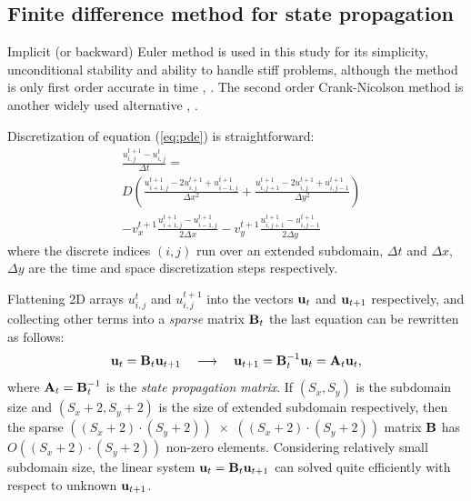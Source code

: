 \documentclass[conference,compsoc]{IEEEtran}
\begin{document}
\subsection{Finite difference method for state propagation\label{sec:finit-diff}}

Implicit (or backward) Euler method is used in this study for its simplicity, unconditional stability and ability to handle stiff problems, although the method is only first order accurate in time \cite{Sauer11}, \cite{Butcher03}. The second order Crank-Nicolson method is another widely used alternative \cite{Crank47}, \cite{Thomas95}.

\newcommand{\myu}[3]{u_{{#1},{#2}}^{#3}}
Discretization of equation (\ref{eq:pde}) is straightforward: 
\begin{equation}
\begin{aligned}
& \frac{\myu{i}{j}{t+1} - \myu{i}{j}{t}}{\Delta t} = {}\\
& D \left (
\frac{\myu{i+1}{j}{t+1} - 2\myu{i}{j}{t+1} + \myu{i-1}{j}{t+1}}{\Delta{x}^2} +  
\frac{\myu{i}{j+1}{t+1} - 2\myu{i}{j}{t+1} + \myu{i}{j-1}{t+1}}{\Delta{y}^2} \right) \\
& -v_x^{t+1} \frac{\myu{i+1}{j}{t+1} - \myu{i-1}{j}{t+1}}{2\Delta{x}}  
-v_y^{t+1} \frac{\myu{i}{j+1}{t+1} - \myu{i}{j-1}{t+1}}{2\Delta{y}} 
\end{aligned}
\label{eq:discrete-pde}
\end{equation}
where the discrete indices $(i,j)$ run over an extended subdomain, $\Delta{t}$ and $\Delta{x}$, $\Delta{y}$ are the time and space discretization steps respectively.

Flattening 2D arrays $\myu{i}{j}{t}$ and $\myu{i}{j}{t+1}$ into the vectors ${\bf u}_{t}$ and ${\bf u}_{t+1}$ respectively, and collecting other terms into a \textit{sparse} matrix ${\bf B}_t$ the last equation can be rewritten as follows:
\begin{equation}
{\bf u}_{t} = {\bf B}_t {\bf u}_{t+1} \quad \longrightarrow \quad
{\bf u}_{t+1} = {\bf B}^{-1}_t {\bf u}_{t} = {\bf A}_t {\bf u}_{t},
\label{eq:state-propag}
\end{equation}
where ${\bf A}_t = {\bf B}^{-1}_t$ is the \textit{state propagation matrix}. If $(S_x,S_y)$ is the subdomain size and $(S_x\!+\!2,S_y\!+\!2)$ is the size of extended subdomain respectively, then the sparse $((S_x\!+\!2)\!\cdot\!(S_y\!+\!2))\,\,{\times}\,\,((S_x\!+\!2)\!\cdot\!(S_y\!+\!2))$ matrix ${\bf B}$ has $O((S_x\!+\!2)\!\cdot\!(S_y\!+\!2))$ non-zero elements. Considering relatively small subdomain size, the linear system ${\bf u}_{t} = {\bf B}_t {\bf u}_{t+1}$ can solved quite efficiently with respect to unknown ${\bf u}_{t+1}$.
\end{document}
